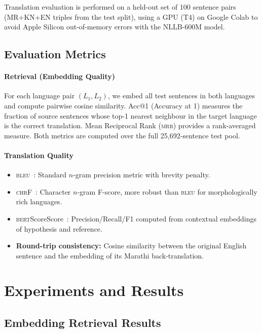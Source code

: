 \documentclass[11pt,a4paper]{article}
\makeatletter
\newcommand{\bleu}{\textsc{bleu}}
\newcommand{\chrf}{\textsc{chr}F}
\newcommand{\bert}{\textsc{bert}Score}
\newcommand{\acc}{Acc@1}
\newcommand{\mrr}{\textsc{mrr}}
\makeatother
\begin{document}
Translation evaluation is performed on a held-out set of 100
sentence pairs (MR+KN+EN triples from the test split),
using a GPU (T4) on Google Colab to avoid Apple Silicon
out-of-memory errors with the NLLB-600M model.

\subsection{Evaluation Metrics}

\paragraph{Retrieval (Embedding Quality)}
For each language pair $(L_1, L_2)$, we embed all test sentences
in both languages and compute pairwise cosine similarity.
\acc{} (Accuracy at 1) measures the fraction of source sentences
whose top-1 nearest neighbour in the target language is the correct
translation.
Mean Reciprocal Rank (\mrr{}) provides a rank-averaged measure.
Both metrics are computed over the full 25,692-sentence test pool.

\paragraph{Translation Quality}
\begin{itemize}[leftmargin=*]
  \item \bleu{}~\cite{papineni2002bleu}: Standard $n$-gram precision
    metric with brevity penalty.
  \item \chrf{}~\cite{popovic2015chrf}: Character $n$-gram F-score,
    more robust than \bleu{} for morphologically rich languages.
  \item \bert{}Score~\cite{zhang2020bertscore}: Precision/Recall/F1
    computed from contextual embeddings of hypothesis and reference.
  \item \textbf{Round-trip consistency:} Cosine similarity between
    the original English sentence and the embedding of its
    Marathi back-translation.
\end{itemize}

\section{Experiments and Results}
\label{sec:results}

\subsection{Embedding Retrieval Results}
\end{document}
